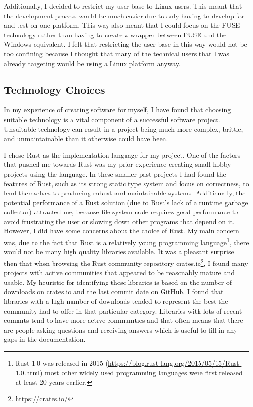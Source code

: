 Additionally, I decided to restrict my user base to Linux users. This meant
that the development process would be much easier due to only having to develop
for and test on one platform. This way also meant that I could focus on the
FUSE technology rather than having to create a wrapper between FUSE and the
Windows equivalent. I felt that restricting the user base in this way would not
be too confining because I thought that many of the technical users that I was
already targeting would be using a Linux platform anyway.

\subsection{Technology Choices}

In my experience of creating software for myself, I have found that choosing
suitable technology is a vital component of a successful software project.
Unsuitable technology can result in a project being much more complex, brittle,
and unmaintainable than it otherwise could have been.

I chose Rust as the implementation language for my project. One of the factors
that pushed me towards Rust was my prior experience creating small hobby
projects using the language. In these smaller past projects I had found the
features of Rust, such as its strong static type system and focus on
correctness, to lend themselves to producing robust and maintainable systems.
Additionally, the potential performance of a Rust solution (due to Rust's lack
of a runtime garbage collector) attracted me, because file system code requires
good performance to avoid frustrating the user or slowing down other programs
that depend on it. However, I did have some concerns about the choice of Rust.
My main concern was, due to the fact that Rust is a relatively young
programming language\footnote{Rust 1.0 was released in 2015
(\url{https://blog.rust-lang.org/2015/05/15/Rust-1.0.html}) most other widely
used programming languages were first released at least 20 years earlier.},
there would not be many high quality libraries available. It was a pleasant
surprise then that when browsing the Rust community repository
crates.io\footnote{\url{https://crates.io/}}, I found many projects with active
communities that appeared to be reasonably mature and usable. My heuristic for
identifying these libraries is based on the number of downloads on crates.io
and the last commit date on GitHub. I found that libraries with a high number
of downloads tended to represent the best the community had to offer in that
particular category. Libraries with lots of recent commits tend to have more
active communities and that often means that there are people asking questions
and receiving answers which is useful to fill in any gaps in the documentation.

